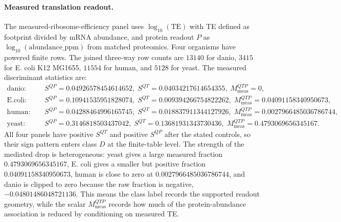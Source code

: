 \paragraph{Measured translation readout.}
The measured-ribosome-efficiency panel uses $\log_{10}(\mathrm{TE})$ with TE defined as footprint divided by mRNA abundance, and protein readout $P$ as $\log_{10}(\mathrm{abundance\_ppm})$ from matched proteomics.  Four organisms have powered finite rows.  The joined three-way row counts are $13140$ for danio, $3415$ for E. coli K12 MG1655, $11554$ for human, and $5128$ for yeast.  The measured discriminant statistics are:
$$
\begin{aligned}
\mathrm{danio}:&\quad S^{QP}=0.04926578454614652,\; S^{QT}=0.04034217614654355,\; M^{QTP}_{\mathrm{meas}}=0,\\
\mathrm{E.coli}:&\quad S^{QP}=0.10941535951828074,\; S^{QT}=0.009394266754822262,\; M^{QTP}_{\mathrm{meas}}=0.04091158340950673,\\
\mathrm{human}:&\quad S^{QP}=0.04288464996165745,\; S^{QT}=0.018837911344127926,\; M^{QTP}_{\mathrm{meas}}=0.0027966485036786744,\\
\mathrm{yeast}:&\quad S^{QP}=0.3146818503437042,\; S^{QT}=0.13681931343730436,\; M^{QTP}_{\mathrm{meas}}=0.4793069656345167.
\end{aligned}
$$
All four panels have positive $S^{QT}$ and positive $S^{QP}$ after the stated controls, so their sign pattern enters class $D$ at the finite-table level.  The strength of the mediated drop is heterogeneous: yeast gives a large measured fraction $0.4793069656345167$, E. coli gives a smaller but positive fraction $0.04091158340950673$, human is close to zero at $0.0027966485036786744$, and danio is clipped to zero because the raw fraction is negative, $-0.04801486048721136$.  This means the class label records the supported readout geometry, while the scalar $M^{QTP}_{\mathrm{meas}}$ records how much of the protein-abundance association is reduced by conditioning on measured TE.

